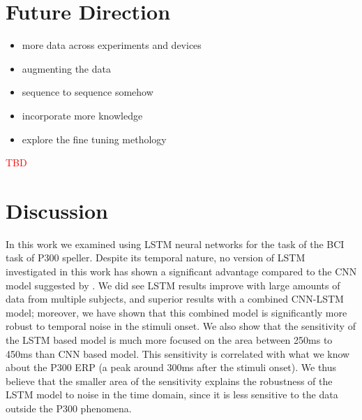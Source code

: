 \documentclass[
12pt, %
english, %
doublespacing, %
headsepline, %
]{MastersDoctoralThesis} %
\begin{document}
\chapter{Future Direction}
\begin{itemize}
	\item more data across experiments and devices
	\item augmenting the data
	\item sequence to sequence somehow
	\item incorporate more knowledge
	\item explore the fine tuning methology
\end{itemize}
\textcolor{red}{TBD}




\chapter{Discussion}

In this work we examined using LSTM neural networks for the task of the BCI task of P300 speller. Despite its temporal nature, no version of LSTM investigated in this work has shown a significant advantage compared to the CNN model suggested by \cite{P300_CNN}. We did see LSTM results improve with large amounts of data from multiple subjects, and superior results with a combined CNN-LSTM model; moreover, we have shown that this combined model is significantly more robust to temporal noise in the stimuli onset. We also show that the sensitivity of the LSTM based model is much more focused on the area between 250ms to 450ms than CNN based model. This sensitivity is correlated with what we know about the P300 ERP (a peak around 300ms after the stimuli onset). We thus believe that the smaller area of the sensitivity explains the robustness of the LSTM model to noise in the time domain, since it is less sensitive to the data outside the P300 phenomena.  




\appendix %






\end{document}
